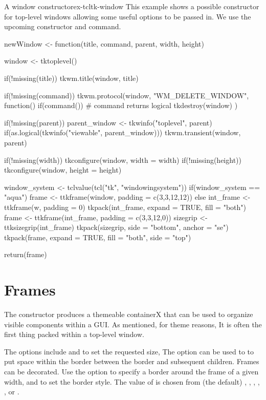 \begin{example}{A window constructor}{ex-tcltk-window}
  This example shows a possible constructor for top-level windows
  allowing some useful options to be passed in. We use the upcoming
   constructor and  command.
\begin{Schunk}
\begin{Sinput}
 newWindow <- function(title, command, parent,
                       width, height) {
   window <- tktoplevel()
 
   if(!missing(title)) tkwm.title(window, title)
 
   if(!missing(command)) 
     tkwm.protocol(window, "WM_DELETE_WINDOW", function() {
       if(command())            # command returns logical
         tkdestroy(window)
     })
 
   if(!missing(parent)) {
     parent_window <- tkwinfo("toplevel", parent)
     if(as.logical(tkwinfo("viewable", parent_window))) {
       tkwm.transient(window, parent)
     }
   }
   
   if(!missing(width)) tkconfigure(window, width = width)
   if(!missing(height)) tkconfigure(window, height = height)
 
   window_system <- tclvalue(tcl("tk", "windowingsystem"))
   if(window_system == "aqua") {
     frame <- ttkframe(window, padding = c(3,3,12,12))
   } else {
     int_frame <- ttkframe(w, padding = 0)
     tkpack(int_frame, expand = TRUE, fill = "both")
     frame <- ttkframe(int_frame, padding = c(3,3,12,0))
     sizegrip <- ttksizegrip(int_frame)
     tkpack(sizegrip, side = "bottom", anchor = "se")
   }
   tkpack(frame, expand = TRUE, fill = "both", side = "top")
 
   return(frame)
 }
\end{Sinput}
\end{Schunk}
\end{example}

\section{Frames}
\label{sec:tcltk:frames}

The  constructor produces a themeable containerX
that can be used to organize visible components within a GUI. As
mentioned, for theme reasons, It is
often the first thing packed within a top-level window. 

The options include  and
 to set the requested size,
The 
option can be used to to put space within the border between the
border and subsequent children. Frames can be decorated. Use the
option  to specify a border around the frame of
a given width, and  to set the border
style. The value of  is chosen from (the default)
, , , ,
, or .  

